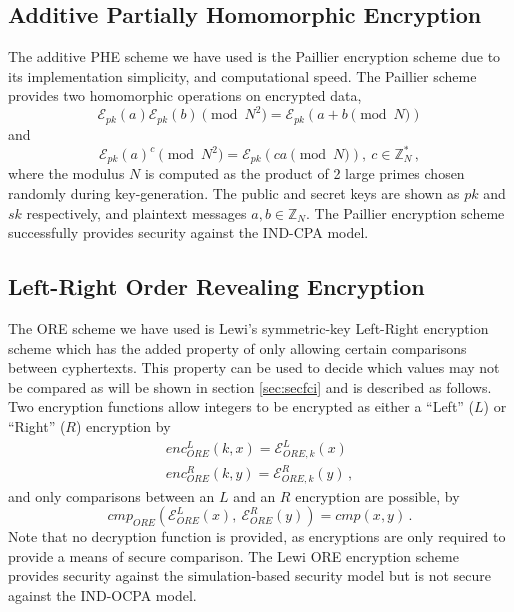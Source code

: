 \documentclass[letterpaper, 10 pt, conference]{ieeeconf}  %
\begin{document}
\subsection{Additive Partially Homomorphic Encryption} \label{subsec:paillier}
The additive PHE scheme we have used is the Paillier encryption scheme \cite{paillierPublicKeyCryptosystemsBased1999} due to its implementation simplicity, and computational speed. The Paillier scheme provides two homomorphic operations on encrypted data, 
\begin{equation}
   \mathcal{E}_{pk}(a)\mathcal{E}_{pk}(b) \!\!\pmod{N^{2}} = \mathcal{E}_{pk}(a + b \!\!\pmod{N}) \label{eqn:paillier_add}
\end{equation}
and
\begin{equation}
   \mathcal{E}_{pk}(a)^c \!\!\pmod{N^{2}} = \mathcal{E}_{pk}(ca \!\!\pmod{N}),\ c \in \mathbb{Z}^*_N\,, \label{eqn:paillier_mult}
\end{equation}
where the modulus $N$ is computed as the product of 2 large primes chosen randomly during key-generation. The public and secret keys are shown as $pk$ and $sk$ respectively, and plaintext messages $a,b \in \mathbb{Z}_N$. The Paillier encryption scheme successfully provides security against the IND-CPA model.

\subsection{Left-Right Order Revealing Encryption} \label{subsec:lewi}
The ORE scheme we have used is Lewi's symmetric-key Left-Right encryption scheme \cite{lewiOrderRevealingEncryptionNew2016} which has the added property of only allowing certain comparisons between cyphertexts. This property can be used to decide which values may not be compared as will be shown in section \ref{sec:secfci} and is described as follows. Two encryption functions allow integers to be encrypted as either a ``Left'' ($L$) or ``Right'' ($R$) encryption by
\begin{equation}
   \begin{gathered} \label{eqn:lewi_l_r}
      enc^L_{ORE}(k, x) = \mathcal{E}^L_{ORE,k}(x) \\
      enc^R_{ORE}(k, y) = \mathcal{E}^R_{ORE,k}(y)\,,
   \end{gathered}
\end{equation}
and only comparisons between an $L$ and an $R$ encryption are possible, by
\begin{equation}
   cmp_{ORE}(\mathcal{E}^L_{ORE}(x),\ \mathcal{E}^R_{ORE}(y)) = cmp(x, y)\,. \label{eqn:lewi_cmp}
\end{equation}
Note that no decryption function is provided, as encryptions are only required to provide a means of secure comparison. The Lewi ORE encryption scheme provides security against the simulation-based security model \cite{chenettePracticalOrderRevealingEncryption2016} but is not secure against the IND-OCPA model.
\end{document}
